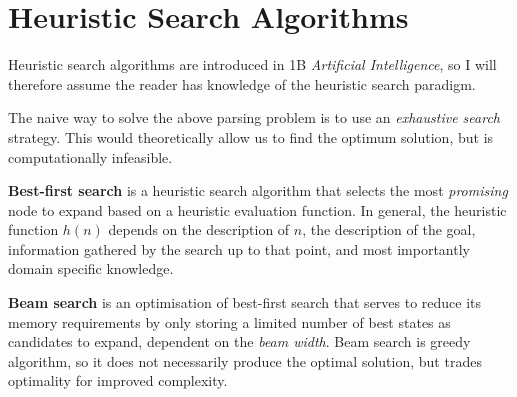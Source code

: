 \documentclass[12pt,a4paper,twoside,openright]{report}
\theoremstyle{definition}
\begin{document}
\section{Heuristic Search Algorithms}

Heuristic search algorithms are introduced in 1B \textit{Artificial Intelligence}, so I will therefore assume the reader has knowledge of the heuristic search paradigm.

The naive way to solve the above parsing problem is to use an \textit{exhaustive search} strategy. This would theoretically allow us to find the optimum solution, but is computationally infeasible.

\textbf{Best-first search} is a heuristic search algorithm that selects the most \textit{promising} node to expand based on a heuristic evaluation function. 
In general, the heuristic function $h(n)$ depends on  the description of $n$, the description of the goal, information gathered by the search up to that point, and most importantly domain specific knowledge\cite{pearlHeuristicsIntelligentSearch1984}.

\textbf{Beam search} is an optimisation of best-first search that serves to reduce its memory requirements by only storing a limited number of best states as candidates to expand, dependent on the \textit{beam width}. Beam search is greedy algorithm, so it does not necessarily produce the optimal solution, but trades optimality for improved complexity.

%
\end{document}
